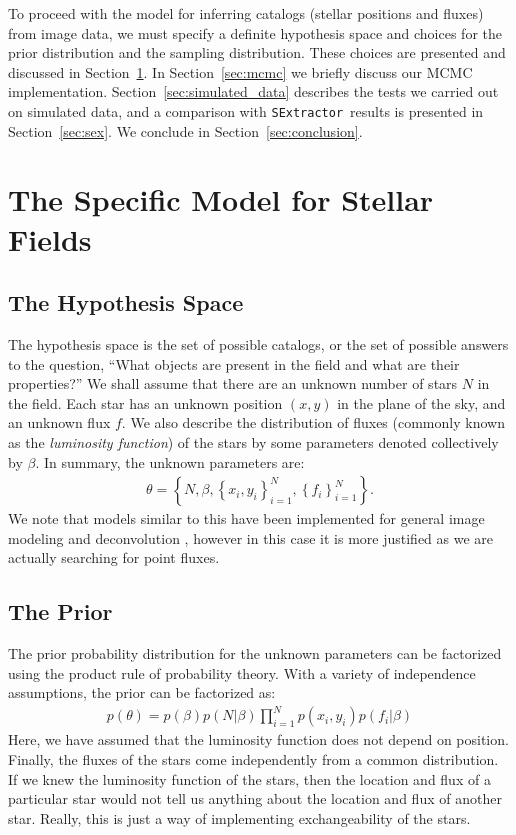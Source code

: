 \documentclass[12pt, preprint]{aastex}
\newcommand{\sex}{{\tt SExtractor}}
\begin{document}
To proceed with the model for inferring catalogs (stellar positions and fluxes)
from image data, we must
specify a definite hypothesis space and choices for the prior distribution
and the sampling distribution. These choices are presented and discussed in
Section~\ref{sec:model}. In Section~\ref{sec:mcmc} we briefly discuss our
MCMC implementation. Section~\ref{sec:simulated_data} describes the tests we
carried out on simulated data, and a comparison with \sex~results is presented
in Section~\ref{sec:sex}. We conclude in Section~\ref{sec:conclusion}.

\section{The Specific Model for Stellar Fields}\label{sec:model}
\subsection{The Hypothesis Space}
The hypothesis space is the set of possible catalogs, or the set of possible
answers to the question, ``What objects are present in the field and
what are their properties?'' We shall assume that there are an unknown number of stars
$N$ in the field. Each star has an unknown
position $(x,y)$ in the plane of the sky, and an unknown flux $f$. We also
describe the distribution of fluxes (commonly known as the {\it luminosity
function}) of the stars by some parameters denoted collectively by $\beta$.
In summary, the unknown parameters are:
\begin{eqnarray}
\theta = \left\{N, \beta, \left\{x_i, y_i\right\}_{i=1}^N,
\left\{f_i\right\}_{i=1}^N\right\}.
\end{eqnarray}
We note that models similar to this have been implemented for general image
modeling and deconvolution \citep[e.g.][]{massinf}, however in this case it is
more justified as we are actually searching for point fluxes.

\subsection{The Prior}
The prior probability distribution for the unknown parameters can be factorized
using the product rule of probability theory.
With a variety of independence assumptions, the prior
can be factorized as:
\begin{eqnarray}
p(\theta) = p(\beta)p(N|\beta)\prod_{i=1}^N p(x_i, y_i)
p(f_i | \beta)
\end{eqnarray}
Here, we have assumed that the luminosity function does not depend on position.
Finally, the fluxes of the stars come independently from
a common distribution. If we knew the luminosity
function of the stars, then the location and flux of a particular star would
not tell us anything about the location and flux of another star. Really, this
is just a way of implementing exchangeability of the stars.
\end{document}
